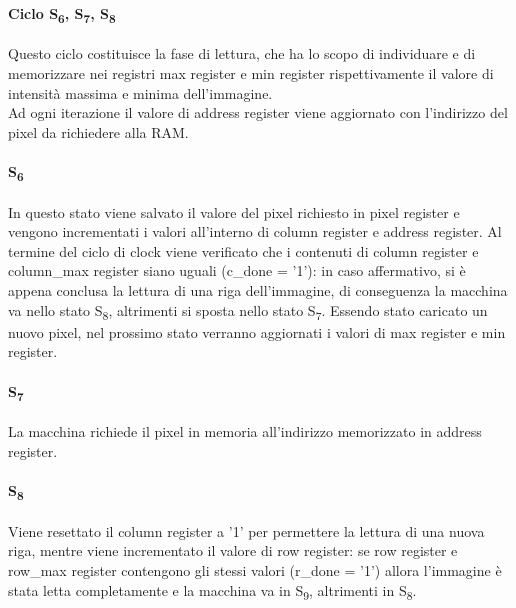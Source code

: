 \paragraph{Ciclo S\textsubscript{6}, S\textsubscript{7}, S\textsubscript{8}}
Questo ciclo costituisce la fase di lettura, che ha lo scopo di individuare e di memorizzare nei registri max register e min register rispettivamente il valore di intensità massima e minima dell'immagine.\\
Ad ogni iterazione il valore di address register viene aggiornato con l'indirizzo del pixel da richiedere alla RAM.
\paragraph{S\textsubscript{6}}
In questo stato viene salvato il valore del pixel richiesto in pixel register e vengono incrementati i valori all'interno di column register e address register. Al termine del ciclo di clock viene verificato che i contenuti di column register e column\_max register siano uguali (c\_done = '1'): in caso affermativo, si è appena conclusa la lettura di una riga dell'immagine, di conseguenza la macchina va nello stato S\textsubscript{8}, altrimenti si sposta nello stato S\textsubscript{7}.
Essendo stato caricato un nuovo pixel, nel prossimo stato verranno aggiornati i valori di max register e min register.
\paragraph{S\textsubscript{7}}
La macchina richiede il pixel in memoria all'indirizzo memorizzato in address register.
\paragraph{S\textsubscript{8}}
Viene resettato il column register a '1' per permettere la lettura di una nuova riga, mentre viene incrementato il valore di row register: se row register e row\_max register contengono gli stessi valori (r\_done = '1') allora l'immagine è stata letta completamente e la macchina va in S\textsubscript{9}, altrimenti in S\textsubscript{8}.

